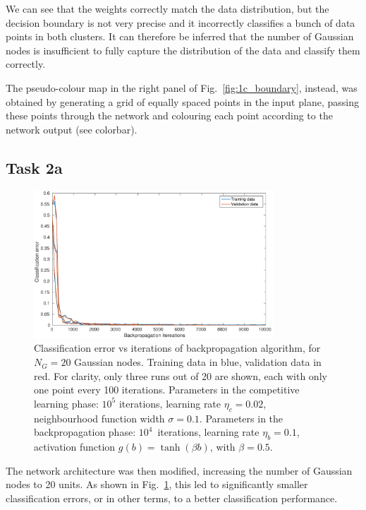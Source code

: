 \documentclass[12pt,titlepage]{article}
\begin{document}
We can see that the weights correctly match the data distribution, but the decision boundary is not very precise and it incorrectly classifies a bunch of data points in both clusters. It can therefore be inferred that the number of Gaussian nodes is insufficient to fully capture the distribution of the data and classify them correctly.

The pseudo-colour map in the right panel of Fig.~\ref{fig:1c_boundary}, instead, was obtained by generating a grid of equally spaced points in the input plane, passing these points through the network and colouring each point according to the network output (see colorbar).

\clearpage
\subsection*{Task 2a}

\begin{figure}[htbp]
\centering
\includegraphics[width=0.8\textwidth]{2a_error.pdf}
\caption{Classification error vs iterations of backpropagation algorithm, for $N_G = 20$ Gaussian nodes. Training data in blue, validation data in red. For clarity, only three runs out of 20 are shown, each with only one point every 100 iterations. Parameters in the competitive learning phase: $10^5$ iterations, learning rate $\eta_c = 0.02$, neighbourhood function width $\sigma = 0.1$. Parameters in the backpropagation phase: $10^4$~iterations, learning rate $\eta_b = 0.1$, activation function $g(b) = \tanh(\beta b)$, with $\beta = 0.5$.}
\label{2a_error}
\end{figure}

The network architecture was then modified, increasing the number of Gaussian nodes to 20 units. As shown in Fig.~\ref{2a_error}, this led to significantly smaller classification errors, or in other terms, to a better classification performance.
\end{document}
